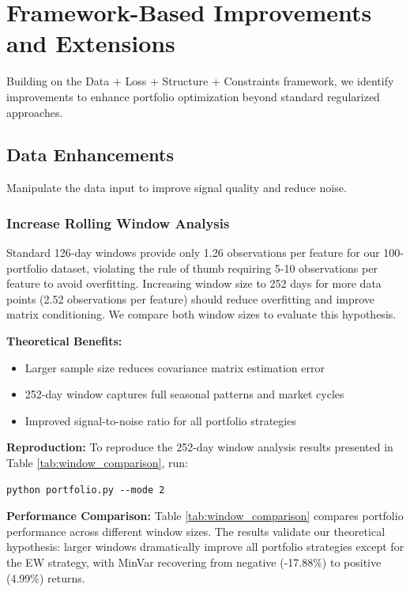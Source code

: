 \documentclass[12pt]{article}
\begin{document}
\section{Framework-Based Improvements and Extensions}

Building on the Data + Loss + Structure + Constraints framework, we identify improvements to enhance portfolio optimization beyond standard regularized approaches.

\subsection{Data Enhancements}

Manipulate the data input to improve signal quality and reduce noise.

\subsubsection{Increase Rolling Window Analysis}

Standard 126-day windows provide only 1.26 observations per feature for our 100-portfolio dataset, violating the rule of thumb requiring 5-10 observations per feature to avoid overfitting. Increasing window size to 252 days for more data points (2.52 observations per feature) should reduce overfitting and improve matrix conditioning. We compare both window sizes to evaluate this hypothesis.

\textbf{Theoretical Benefits:}
\begin{itemize}
    \item Larger sample size reduces covariance matrix estimation error
    \item 252-day window captures full seasonal patterns and market cycles
    \item Improved signal-to-noise ratio for all portfolio strategies
\end{itemize}

\textbf{Reproduction:}
To reproduce the 252-day window analysis results presented in Table \ref{tab:window_comparison}, run:
\begin{lstlisting}
python portfolio.py --mode 2
\end{lstlisting}

\textbf{Performance Comparison:}
Table \ref{tab:window_comparison} compares portfolio performance across different window sizes. The results validate our theoretical hypothesis: larger windows dramatically improve all portfolio strategies except for the EW strategy, with MinVar recovering from negative (-17.88\%) to positive (4.99\%) returns.
\end{document}
